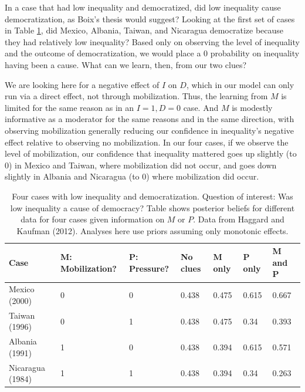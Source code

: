 \documentclass[12pt,]{book}
\begin{document}
In a case that had low inequality and democratized, did low inequality cause democratization, as Boix's thesis would suggest? Looking at the first set of cases in Table \ref{tab:HK8cases1}, did Mexico, Albania, Taiwan, and Nicaragua democratize because they had relatively low inequality? Based only on observing the level of inequality and the outcome of democratization, we would place a 0 probability on inequality having been a cause. What can we learn, then, from our two clues?

We are looking here for a negative effect of \(I\) on \(D\), which in our model can only run via a direct effect, not through mobilization. Thus, the learning from \(M\) is limited for the same reason as in an \(I=1, D=0\) case. And \(M\) is modestly informative as a moderator for the same reasons and in the same direction, with observing mobilization generally reducing our confidence in inequality's negative effect relative to observing no mobilization. In our four cases, if we observe the level of mobilization, our confidence that inequality mattered goes up slightly (to 0) in Mexico and Taiwan, where mobilization did not occur, and goes down slightly in Albania and Nicaragua (to 0) where mobilization did occur.

\begin{table}[t]

\caption{\label{tab:HK8cases1}Four cases with low inequality and  democratization. Question of interest: Was low inequality a cause of democracy? Table shows posterior beliefs for different data for four cases given information on $M$ or $P$. Data from Haggard and Kaufman (2012). Analyses here use priors assuming only monotonic effects.}
\centering
\begin{tabular}{l|l|l|l|l|l|l}
\hline
Case & M: Mobilization? & P: Pressure? & No clues & M only & P only & M and P\\
\hline
Mexico (2000) & 0 & 0 & 0.438 & 0.475 & 0.615 & 0.667\\
\hline
Taiwan (1996) & 0 & 1 & 0.438 & 0.475 & 0.34 & 0.393\\
\hline
Albania (1991) & 1 & 0 & 0.438 & 0.394 & 0.615 & 0.571\\
\hline
Nicaragua (1984) & 1 & 1 & 0.438 & 0.394 & 0.34 & 0.263\\
\hline
\end{tabular}
\end{table}
\end{document}
